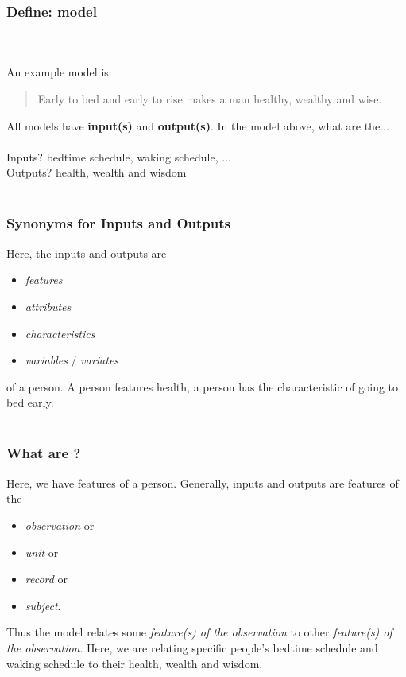 \documentclass[slides]{beamer} %
\begin{document}
\begin{frame}\frametitle{Define: model}

  \pause \\~\\ An example model is:

\begin{quotation}
Early to bed and early to rise makes a man healthy, wealthy and wise.
\end{quotation}

All models have \textbf{input(s)} and \textbf{output(s)}. In the model above, what are the... \\~\\

Inputs? \pause bedtime schedule, waking schedule, ... \\
Outputs? \pause health, wealth and wisdom \\~\\

\end{frame}


\begin{frame}\frametitle{Synonyms for Inputs and Outputs}

\small
Here, the inputs and outputs are 

\begin{itemize}
\item \textit{features} 
\item \textit{attributes} 
\item \textit{characteristics}
\item \textit{variables} / \textit{variates}
\end{itemize}

of a person. A person features health, a person has the characteristic of going to bed early. \\~\\


\end{frame}

\begin{frame}\frametitle{What are ?}

Here, we have features of a person. Generally, inputs and outputs are features of the 

\begin{itemize}
\item \textit{observation} or 
\item \textit{unit} or 
\item \textit{record} or 
\item \textit{subject}.
\end{itemize} 


Thus the model relates some \textit{feature(s) of the observation} to other \textit{feature(s) of the observation}. Here, we are relating specific people's bedtime schedule and waking schedule to their health, wealth and wisdom.
\end{frame}
\end{document}
